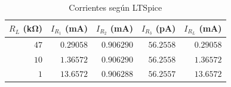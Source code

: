 \begin{table}[H]
    \centering
    \begin{tabular}{@{}r|rrrr@{}}
        \toprule
        $R_L$ (\si{\kilo\ohm}) & $I_{R_1}$ (\si{\milli\ampere}) &
        $I_{R_2}$ (\si{\milli\ampere}) & $I_{R_3}$ (\si{\pico\ampere}) &
        $I_{R_L}$ (\si{\milli\ampere}) \\
        \midrule
        $47$ & $0.29058$ & $0.906290$ & $56.2558$ & $0.29058$ \\
        $10$ & $1.36572$ & $0.906290$ & $56.2558$ & $1.36572$ \\
         $1$ & $13.6572$ & $0.906288$ & $56.2557$ & $13.6572$ \\ \bottomrule
        \end{tabular}
        \caption{Corrientes según LTSpice}
        \label{tab:1:ltspice-corrientes}
\end{table}

